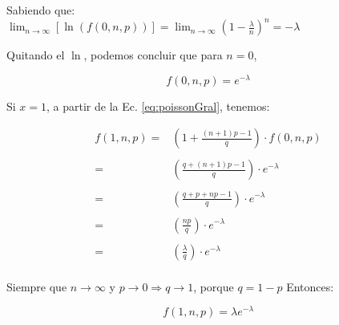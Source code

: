\documentclass{beamer}
\begin{document}
\begin{frame}{}
Sabiendo que: \\

$ \lim_{n \to \infty} [\ln (f(0,n,p))] = \lim_{n \to \infty} (1 -
\frac{\lambda}{n})^n = -\lambda$

\vfill
Quitando el $\ln$, podemos concluir que para $n=0$,

\begin{equation}
  f(0,n,p) = e^{-\lambda}
\end{equation}

\end{frame}

\begin{frame}{}
  Si $x=1$, a partir de la Ec. \eqref{eq:poissonGral}, tenemos:

  \begin{equation}
    \begin{array}{rl}
    f(1,n,p)  = & (1 + \frac{(n+1)p - 1}{q}) \cdot f(0,n,p) \\
    \\
              = & (\frac{q + (n+1)p - 1}{q}) \cdot e^{-\lambda} \\
    \\
              = & (\frac{q + p + np - 1}{q}) \cdot e^{-\lambda} \\
    \\
              = & (\frac{np}{q}) \cdot e^{-\lambda} \\
    \\
              = & (\frac{\lambda}{q}) \cdot e^{-\lambda} \\
    \end{array}
  \end{equation}

  Siempre que $n \to \infty$ y $p \to 0 \Rightarrow q \to 1$, porque $q=1-p$
  Entonces:

  \begin{equation}
  f(1,n,p) = \lambda e^{-\lambda}
  \end{equation}

\end{frame}
\end{document}
